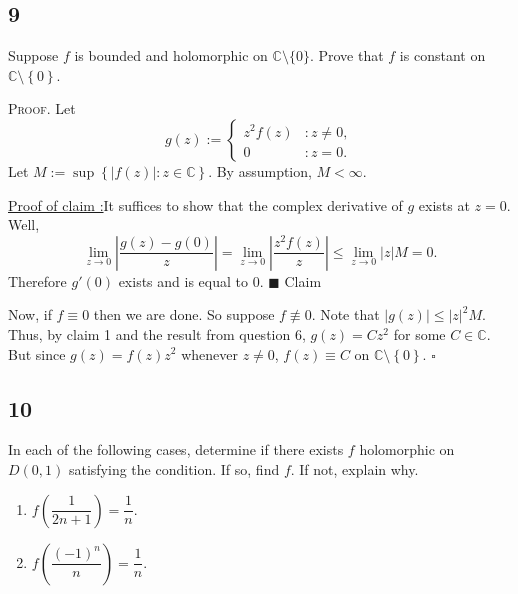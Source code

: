 \documentclass[12pt]{article}
\newcounter{ProofCounter}
\newcounter{ClaimCounter}[ProofCounter]
\newenvironment{Proof}{\stepcounter{ProofCounter}\textsc{Proof.}}{\hfill$\square$}
\newenvironment{claim}[1]{\vspace{1mm}\stepcounter{ClaimCounter}\par\noindent\underline{\bf Claim \theClaimCounter:}\space#1}{}
\newenvironment{claimproof}[1]{\par\noindent\underline{Proof of claim \theClaimCounter:}\space#1}{\hfill $\blacksquare$ Claim \theClaimCounter}
\begin{document}
\newpage 
\subsection*{9}
\begin{tcolorbox}
Suppose $f$ is bounded and holomorphic on $\mathbb{C}\setminus \{0\}$. Prove that $f$ is constant on $\mathbb{C}\setminus\left\{ 0 \right\}$.
\end{tcolorbox}
\begin{Proof}
Let 
\[ g(z) := \left\{ \begin{array}{cl}
z^{2}f(z) & : z \neq 0, \\
0 & : z = 0. 
\end{array} \right. \]
Let $M := \sup\left\{ |f(z)| : z \in \mathbb{C} \right\}$. By assumption, $M < \infty$.
\begin{claimproof}
It suffices to show that the complex derivative of $g$ exists at $z = 0$. Well, 
\[ \lim_{z\rightarrow 0}\left|\frac{g(z) - g(0)}{z}\right|  = \lim_{z\rightarrow 0}\left|\frac{z^{2}f(z)}{z}\right| 
\leq \lim_{z\rightarrow 0} |z|M = 0. \]
Therefore $g'(0)$ exists and is equal to 0.
\end{claimproof}

Now, if $f \equiv 0$ then we are done. So suppose $f \not\equiv 0$. Note that $|g(z)| \leq |z|^{2}M$. Thus, by claim 1 and the result from question 6,
$g(z) = Cz^{2}$ for some $C \in \mathbb{C}$. But since $g(z) = f(z)z^{2}$ whenever $z \neq 0$, $f(z) \equiv C$ on $\mathbb{C}\setminus \left\{ 0
\right\}$.
\end{Proof}


\newpage 
\subsection*{10}
\begin{tcolorbox}
In each of the following cases, determine if there exists $f$ holomorphic on $D(0,1)$ satisfying the condition. If so, find $f$. If not, explain why.
\begin{enumerate}[label=(\alph*),itemsep=4mm,topsep=3mm]
\item $f\left( \dfrac{1}{2n + 1} \right) = \dfrac{1}{n}$.
\item $f\left( \dfrac{(-1)^{n}}{n} \right) = \dfrac{1}{n}$.
\end{enumerate}
\end{tcolorbox}
\end{document}
